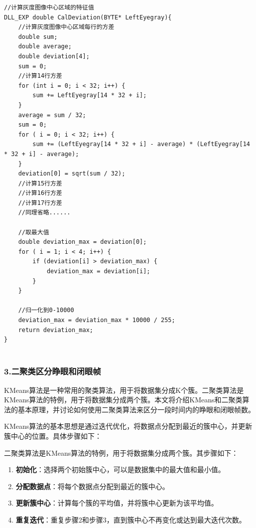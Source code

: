 \documentclass[12pt,hyperref,a4paper,UTF8]{ctexart}
\begin{document}
        \begin{lstlisting}[caption={特征提取}, label={lst:example}]
//计算灰度图像中心区域的特征值
DLL_EXP double CalDeviation(BYTE* LeftEyegray){
	//计算灰度图像中心区域每行的方差
	double sum;
	double average;
	double deviation[4];
	sum = 0;
    //计算14行方差
	for (int i = 0; i < 32; i++) {
		sum += LeftEyegray[14 * 32 + i];
	}
	average = sum / 32;
	sum = 0;
	for ( i = 0; i < 32; i++) {
		sum += (LeftEyegray[14 * 32 + i] - average) * (LeftEyegray[14 * 32 + i] - average);
	}
	deviation[0] = sqrt(sum / 32);
	//计算15行方差
    //计算16行方差
    //计算17行方差
    //同理省略......

	//取最大值
	double deviation_max = deviation[0];
	for ( i = 1; i < 4; i++) {
		if (deviation[i] > deviation_max) {
			deviation_max = deviation[i];
		}
	}

	//归一化到0-10000
	deviation_max = deviation_max * 10000 / 255;
	return deviation_max;
}
            
        \end{lstlisting}

        \subsubsection*{\large \textbf{3.二聚类区分睁眼和闭眼帧}}


        KMeans算法是一种常用的聚类算法，用于将数据集分成K个簇。二聚类算法是KMeans算法的特例，用于将数据集分成两个簇。本文将介绍KMeans和二聚类算法的基本原理，并讨论如何使用二聚类算法来区分一段时间内的睁眼和闭眼帧数。

        KMeans算法的基本思想是通过迭代优化，将数据点分配到最近的簇中心，并更新簇中心的位置。具体步骤如下：

        二聚类算法是KMeans算法的特例，用于将数据集分成两个簇。其步骤如下：

        \begin{enumerate}
            \item \textbf{初始化}：选择两个初始簇中心，可以是数据集中的最大值和最小值。
            \item \textbf{分配数据点}：将每个数据点分配到最近的簇中心。
            \item \textbf{更新簇中心}：计算每个簇的平均值，并将簇中心更新为该平均值。
            \item \textbf{重复迭代}：重复步骤2和步骤3，直到簇中心不再变化或达到最大迭代次数。
        \end{enumerate}
\end{document}
